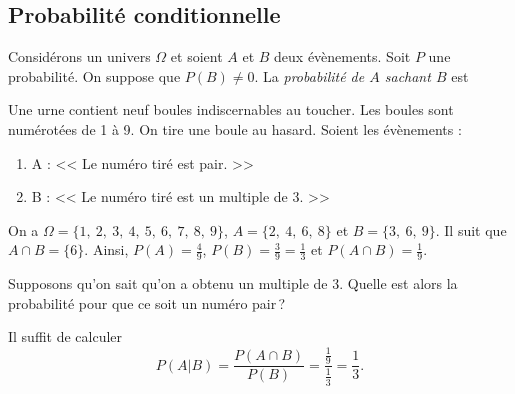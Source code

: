             \subsection{Probabilit\'e conditionnelle}
            Consid\'erons un univers $\Omega$ et soient $A$ et $B$ deux \'ev\`enements.
            Soit $P$ une probabilit\'e.
            On suppose que $P(B) \neq 0$.
            La \emph{probabilit\'e de $A$ sachant $B$} est 
            \begin{ex}
                  Une urne contient neuf boules indiscernables au toucher.
                  Les boules sont num\'erot\'ees de 1 \`a 9.
                  On tire une boule au hasard.
                  Soient les \'ev\`enements : 
                  \begin{enumerate}
                        \item A : << Le num\'ero tir\'e est pair. >>
                        \item B : << Le num\'ero tir\'e est un multiple de 3. >>
                  \end{enumerate}
                  
                  On a $ \Omega = \{ 1,\ 2,\ 3,\ 4,\ 5,\ 6,\ 7,\ 8,\ 9 \}$,
                       $ A = \{ 2,\ 4,\ 6,\ 8 \}$ et
                       $ B = \{ 3,\ 6,\ 9 \}$.
                  Il suit que $A \cap B = \{ 6 \}$.
                  Ainsi, $P(A) = \frac{4}{9}$, $P(B) = \frac{3}{9} = \frac{1}{3}$ et $P(A\cap B) = \frac{1}{9}$.
                  
                  Supposons qu'on sait qu'on a obtenu un multiple de 3.
                  Quelle est alors la probabilit\'e pour que ce soit un num\'ero pair\,?
                  
                  Il suffit de calculer 
                        \[
                        P(A|B) = \frac{P(A\cap B)}{P(B)} = \frac{\frac{1}{9}}{\frac{1}{3}} = \frac{1}{3}.
                        \]
            \end{ex}
